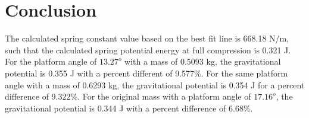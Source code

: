 \documentclass[11pt, titlepage]{article}
\begin{document}
\section*{Conclusion}
The calculated spring constant value based on the best fit line is 668.18 N/m, such that the calculated spring potential energy at full compression is 0.321 J. For the platform angle of $13.27^o$ with a mass of 0.5093 kg, the gravitational potential is 0.355 J with a percent different of 9.577\%. For the same platform angle with a mass of 0.6293 kg, the gravitational potential is 0.354 J for a percent difference of 9.322\%. For the original mass with a platform angle of $17.16^o$, the gravitational potential is 0.344 J with a percent difference of 6.68\%.
\end{document}
